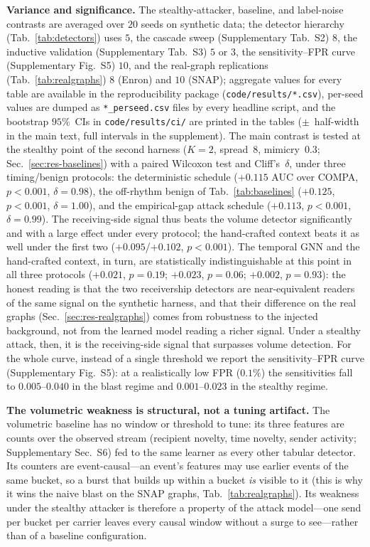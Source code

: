 \smallskip\noindent\textbf{Variance and significance.} The stealthy-attacker, baseline, and label-noise
contrasts are averaged over $20$ seeds on synthetic data; the detector hierarchy (Tab.~\ref{tab:detectors})
uses $5$, the cascade sweep (Supplementary Tab.~S2) $8$, the inductive validation (Supplementary Tab.~S3)
$5$ or $3$, the sensitivity--FPR curve (Supplementary Fig.~S5) $10$, and the real-graph replications
(Tab.~\ref{tab:realgraphs}) $8$ (Enron) and $10$ (SNAP); aggregate values for every table are
available in the reproducibility package (\texttt{code/results/*.csv}), per-seed values are dumped
as \texttt{*\_perseed.csv} files by every headline script, and the bootstrap $95\%$~CIs in
\texttt{code/results/ci/} are printed in the tables ($\pm$~half-width in the main text, full
intervals in the supplement). The main contrast is tested at the stealthy point of the second harness
($K{=}2$, spread~$8$, mimicry~$0.3$; Sec.~\ref{sec:res-baselines}) with a paired Wilcoxon test and
Cliff's~$\delta$, under three timing/benign protocols: the deterministic schedule ($+0.115$ AUC over
COMPA, $p<0.001$, $\delta{=}0.98$), the off-rhythm benign of Tab.~\ref{tab:baselines} ($+0.125$,
$p<0.001$, $\delta{=}1.00$), and the empirical-gap attack schedule ($+0.113$, $p<0.001$,
$\delta{=}0.99$). The receiving-side signal thus beats the volume detector significantly and with a
large effect under every protocol; the hand-crafted context beats it as well under the first two
($+0.095$/$+0.102$, $p<0.001$). The temporal GNN and the hand-crafted context, in turn, are
statistically indistinguishable at this point in all three protocols ($+0.021$, $p{=}0.19$;
$+0.023$, $p{=}0.06$; $+0.002$, $p{=}0.93$): the honest reading is that the two receivership
detectors are near-equivalent readers of the same signal on the synthetic harness, and that their
difference on the real graphs (Sec.~\ref{sec:res-realgraphs}) comes from robustness to the injected
background, not from the learned model reading a richer signal. Under a stealthy attack, then, it is the
receiving-side signal that surpasses volume detection. For the whole curve, instead of a single threshold we report the
sensitivity--FPR curve (Supplementary Fig.~S5): at a realistically low FPR ($0.1\%$) the sensitivities fall to
$0.005$--$0.040$ in the blast regime and $0.001$--$0.023$ in the stealthy regime.

\smallskip\noindent\textbf{The volumetric weakness is structural, not a tuning artifact.} The volumetric baseline has no
window or threshold to tune: its three features are counts over the observed stream (recipient novelty, time
novelty, sender activity; Supplementary Sec.~S6) fed to the same learner as every other tabular detector.
Its counters are event-causal---an event's features may use earlier events of the same bucket, so a burst
that builds up within a bucket \emph{is} visible to it (this is why it wins the naive blast on the SNAP
graphs, Tab.~\ref{tab:realgraphs}). Its weakness under the stealthy attacker is therefore a property of the
attack model---one send per bucket per carrier leaves every causal window without a surge to
see---rather than of a baseline configuration.


